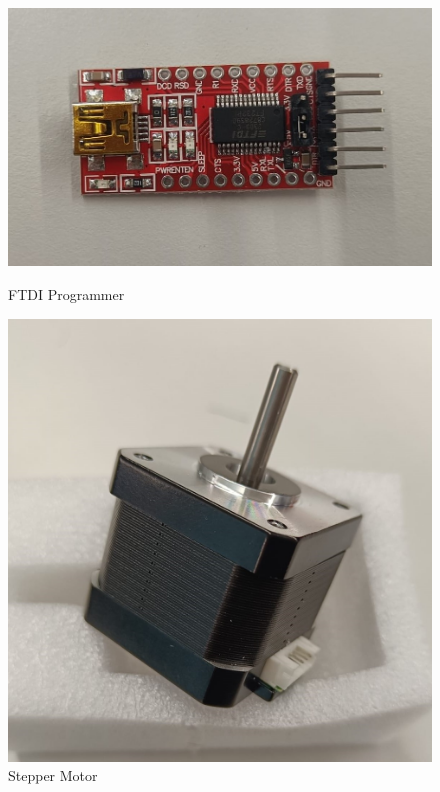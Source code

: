 \documentclass{article}
\begin{document}
\begin{figure}[H]
  \centering
  \begin{minipage}[b]{0.4\textwidth}
    \includegraphics[width=\textwidth]{programmer.jpg}
    \caption{FTDI Programmer}
  \end{minipage}
  \hfill
  \begin{minipage}[b]{0.4\textwidth}
    \includegraphics[width=\textwidth]{stepperMotor.jpg}
    \caption{Stepper Motor}
  \end{minipage}
\end{figure}
\end{document}
